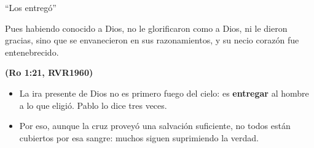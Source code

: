 \documentclass[hyperref={bookmarks=false},aspectratio=169]{beamer}
\newcommand{\grc}[1]{\foreignlanguage{ancientgreek}{#1}}
\newcommand{\fuente}[1]{\par\hfill{\upshape\bfseries\footnotesize\textcolor{azul}{#1}}}
\newcommand{\destacar}[1]{\textbf{\textcolor{azul}{#1}}}
\begin{document}
\begin{frame}{``Los entregó''}
\begin{cita}Pues habiendo conocido a Dios, no le glorificaron como a Dios, ni le dieron gracias, sino que se envanecieron en sus razonamientos, y su necio corazón fue entenebrecido.\fuente{(Ro 1:21, RVR1960)}\end{cita}
\centering
{}\par\medskip
\small\RaggedRight
\begin{itemize}
\item La ira presente de Dios no es primero fuego del cielo: es \destacar{entregar} al hombre a lo que eligió. Pablo lo dice tres veces.
\item Por eso, aunque la cruz proveyó una salvación suficiente, no todos están cubiertos por esa sangre: muchos siguen suprimiendo la verdad.
\end{itemize}
\end{frame}
\end{document}
